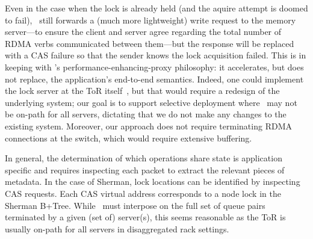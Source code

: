 Even in the case when the lock is already held (and the aquire attempt
is doomed to fail), \sword\ still forwards a (much more lightweight)
write request to the memory server---to ensure the client and server
agree regarding the total number of RDMA verbs communicated between
them---but the response will be replaced with a CAS failure so that
the sender knows the lock acquisition failed.  This is in keeping with
\sword's performance-enhancing-proxy philosophy: it accelerates, but
does not replace, the application's end-to-end semantics.
Indeed, one could implement the lock server at the ToR
itself~\cite{netlock}, but that would require a redesign of the
underlying system; our goal is to support selective deployment where
\sword\ may not be on-path for all servers, dictating that we do not
make any changes to the existing system.  Moreover, our approach does
not require terminating RDMA connections at the switch, which would
require extensive buffering.






In
general, the determination of which operations share state is application
specific and requires inspecting each packet to extract the relevant pieces
of metadata. In the case of Sherman, lock locations can be identified by
inspecting CAS requests. Each CAS virtual address corresponds to a node lock in
the Sherman B+Tree.
While \sword\ must interpose on the full set of queue pairs terminated
by a given (set of) server(s),
this seems reasonable as the ToR is usually on-path for all servers in disaggregated rack settings.


